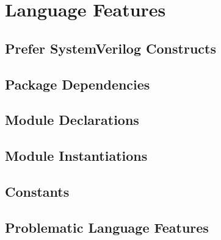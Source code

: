 \chapter{Language Features}
\label{language_features}

  \section{Prefer SystemVerilog Constructs}
  \label{language_features:prefer_systemverilog_constructs}

  \section{Package Dependencies}
  \label{language_features:package_dependencies}

  \section{Module Declarations}
  \label{language_features:module_declarations}

  \section{Module Instantiations}
  \label{language_features:module_instantiations}

  \section{Constants}
  \label{language_features:constants}

  \section{Problematic Language Features}
  \label{language_features:problematic_language_features}